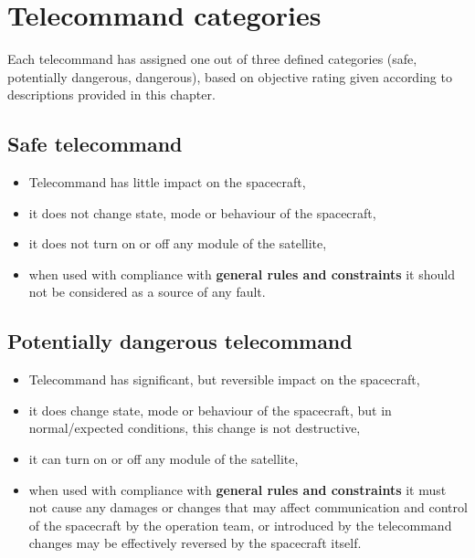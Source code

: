\section{Telecommand categories}
\label{sec:tc_categories}

Each telecommand has assigned one out of three defined categories (safe, potentially dangerous, dangerous), based on objective rating given according to descriptions provided in this chapter.

\subsection{Safe telecommand}
\vspace{1em}
\begin{itemize}
    \item Telecommand has little impact on the spacecraft,
    \item it does not change state, mode or behaviour of the spacecraft,
    \item it does not turn on or off any module of the satellite,
    \item when used with compliance with \textbf{general rules and constraints} it should not be considered as a source of any fault.
\end{itemize}

\subsection{Potentially dangerous telecommand}
\vspace{1em}
\begin{itemize}
    \item Telecommand has significant, but reversible impact on the spacecraft,
    \item it does change state, mode or behaviour of the spacecraft, but in normal/expected conditions, this change is not destructive,
    \item it can turn on or off any module of the satellite,
    \item when used with compliance with \textbf{general rules and constraints} it must not cause any damages or changes that may affect communication and control of the spacecraft by the operation team, or introduced by the telecommand changes may be effectively reversed by the spacecraft itself.
\end{itemize}


